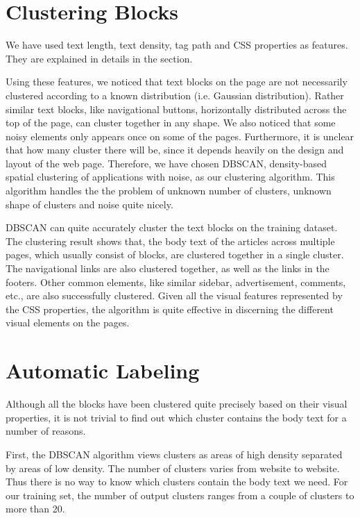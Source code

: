 \documentclass{acm_proc_article-sp}
\begin{document}
\section{Clustering Blocks}
We have used text length, text density, tag path and CSS properties as features. They are explained in details in the  section.

Using these features, we noticed that text blocks on the page are not necessarily clustered according to a known distribution (i.e. Gaussian distribution). Rather similar text blocks, like navigational buttons, horizontally distributed across the top of the page, can cluster together in any shape. We also noticed that some noisy elements only appears once on some of the pages. Furthermore, it is unclear that how many cluster there will be, since it depends heavily on the design and layout of the web page. Therefore, we have chosen DBSCAN\cite{ester:dbscan}, density-based spatial clustering of applications with noise, as our clustering algorithm. This algorithm handles the the problem of unknown number of clusters, unknown shape of clusters and noise quite nicely.

DBSCAN can quite accurately cluster the text blocks on the training dataset. The clustering result shows that, the body text of the articles across multiple pages, which usually consist of blocks, are clustered together in a single cluster. The navigational links are also clustered together, as well as the links in the footers. Other common elements, like similar sidebar, advertisement, comments, etc., are also successfully clustered. Given all the visual features represented by the CSS properties, the algorithm is quite effective in discerning the different visual elements on the pages.

\section{Automatic Labeling}

Although all the blocks have been clustered quite precisely based on their visual properties, it is not trivial to find out which cluster contains the body text for a number of reasons.

First, the DBSCAN algorithm views clusters as areas of high density separated by areas of low density. The number of clusters varies from website to website. Thus there is no way to know which clusters contain the body text we need. For our training set, the number of output clusters ranges from a couple of clusters to more than 20.
\end{document}
